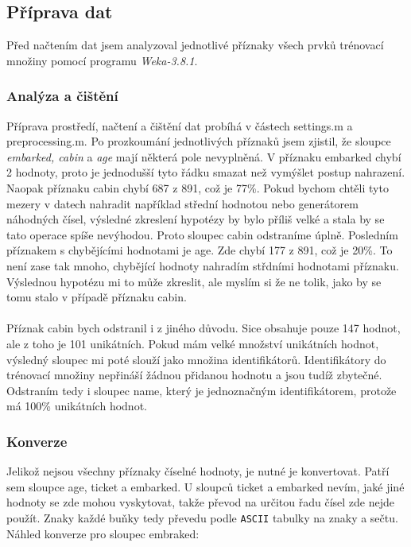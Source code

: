 \documentclass[a4]{article}
\begin{document}
\subsection{Příprava dat}
Před načtením dat jsem analyzoval jednotlivé příznaky všech prvků trénovací množiny pomocí programu \textit{Weka-3.8.1}.

\subsubsection{Analýza a čištění}

Příprava prostředí, načtení a čištění dat probíhá v částech settings.m a preprocessing.m. Po prozkoumání jednotlivých příznaků jsem zjistil, že sloupce \textit{embarked, cabin} a \textit{age} mají některá pole nevyplněná. V příznaku embarked chybí 2 hodnoty, proto je jednodušší tyto řádku smazat než vymýšlet postup nahrazení. Naopak příznaku cabin chybí 
687 z 891, což je 77\%. Pokud bychom chtěli tyto mezery v datech nahradit například střední hodnotou nebo generátorem náhodných čísel, výsledné zkreslení hypotézy by bylo příliš velké a stala by se tato operace spíše nevýhodou. Proto sloupec cabin odstraníme úplně. Posledním příznakem s chybějícími hodnotami je age. Zde chybí 177 z 891, což je 20\%. To není zase tak mnoho, chybějící hodnoty nahradím střdními hodnotami příznaku. Výslednou hypotézu mi to může zkreslit, ale myslím si že ne tolik, jako by se tomu stalo v případě příznaku cabin.
\\\\
Příznak cabin bych odstranil i z jiného důvodu. Sice obsahuje pouze 147 hodnot, ale z toho je 101 unikátních. Pokud mám velké množství unikátních hodnot, výsledný sloupec mi poté slouží jako množina identifikátorů. Identifikátory do trénovací množiny nepřináší žádnou přidanou hodnotu a jsou tudíž zbytečné. Odstraním tedy i sloupec name, který je jednoznačným identifikátorem, protože má 100\% unikátních hodnot.

\subsubsection{Konverze}
Jelikož nejsou všechny příznaky číselné hodnoty, je nutné je konvertovat. Patří sem sloupce age, ticket a embarked. U sloupců ticket a embarked nevím, jaké jiné hodnoty se zde mohou vyskytovat, takže převod na určitou řadu čísel zde nejde použít. Znaky každé buňky tedy převedu podle \texttt{ASCII} tabulky na znaky a sečtu. Náhled konverze pro sloupec embraked:
\end{document}
